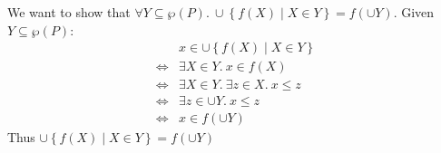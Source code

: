\begin{exercise}
\begin{enumerate}
            We want to show that $\forall Y \subseteq \wp(P).\ \cup \left\{f(X) \mid X \in Y\right\} = f(\cup Y)$. Given $Y \subseteq \wp(P)$:
            \begin{align*}
                &x \in \cup \left\{f(X) \mid X \in Y\right\} \\
                \iff& \exists X \in Y.\ x \in f(X) \\
                \iff& \exists X \in Y.\ \exists z \in X.\ x \leq z \\
                \iff& \exists z \in \cup Y.\ x \leq z \\
                \iff& x \in f(\cup Y)
            \end{align*}
            Thus $\cup \left\{f(X) \mid X \in Y\right\} = f(\cup Y)$
    \end{enumerate}
\end{exercise}
